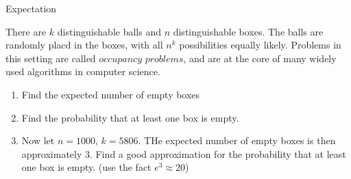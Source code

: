\documentclass[8pt]{beamer}
\begin{document}
\begin{frame}{Expectation}
    \begin{example}
        There are $k$ distinguishable balls and $n$ distinguishable boxes. The balls are randomly placd in the boxes, with all $n^k$ possibilities equally likely. Problems in this setting are called $\textit{occupancy problems}$, and are at the core of many widely used algorithms in computer science.
        \begin{enumerate}
            \item Find the expected number of empty boxes
            \item Find the probability that at least one box is empty.
            \item Now let $n=1000$, $k=5806$. THe expected number of empty boxes is then approximately $3$. Find a good approximation for the probability that at least one box is empty. (use the fact $e^3 \approx 20$)
        \end{enumerate}
    \end{example}
\end{frame}



\end{document}
